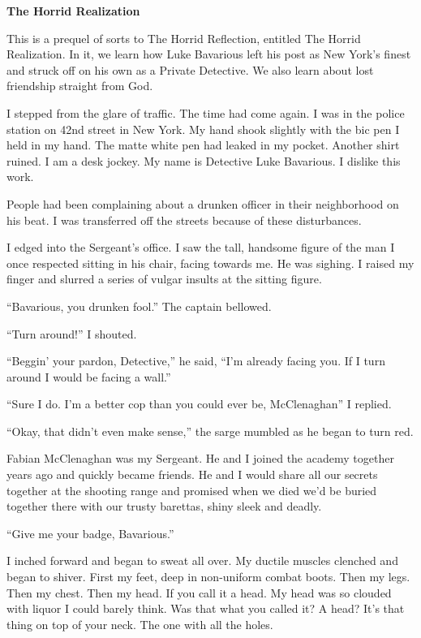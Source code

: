 {\bf The Horrid Realization}

%

This is a prequel of sorts to The Horrid Reflection, entitled The
Horrid Realization. In it, we learn how Luke Bavarious left his
post as New York's finest and struck off on his own as a Private
Detective. We also learn about lost friendship straight from
God.




I stepped from the glare of traffic. The time had come again. I was
in the police station on 42nd street in New York. My hand shook
slightly with the bic pen I held in my hand. The matte white pen
had leaked in my pocket. Another shirt ruined. I am a desk jockey.
My name is Detective Luke Bavarious. I dislike this work.

People had been complaining about a drunken officer in their
neighborhood on his beat. I was transferred off the streets because
of these disturbances.

I edged into the Sergeant's office. I saw the tall, handsome figure
of the man I once respected sitting in his chair, facing towards
me. He was sighing. I raised my finger and slurred a series of
vulgar insults at the sitting figure.

``Bavarious, you drunken fool.'' The captain bellowed.

``Turn around!'' I shouted.

``Beggin' your pardon, Detective,'' he said, ``I'm already facing you.
If I turn around I would be facing a wall.''

``Sure I do. I'm a better cop than you could ever be, McClenaghan'' I
replied.

``Okay, that didn't even make sense,'' the sarge mumbled as he began
to turn red.

Fabian McClenaghan was my Sergeant. He and I joined the academy
together years ago and quickly became friends. He and I would share
all our secrets together at the shooting range and promised when we
died we'd be buried together there with our trusty barettas, shiny
sleek and deadly.

``Give me your badge, Bavarious.''

I inched forward and began to sweat all over. My ductile muscles
clenched and began to shiver. First my feet, deep in non-uniform
combat boots. Then my legs. Then my chest. Then my head. If you
call it a head. My head was so clouded with liquor I could barely
think. Was that what you called it? A head? It's that thing on top
of your neck. The one with all the holes.

